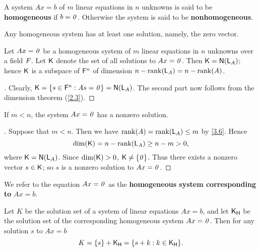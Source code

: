 \begin{defn}\label{3.3.2}
  A system \(Ax = b\) of \(m\) linear equations in \(n\) unknowns is said to be \textbf{homogeneous} if \(b = \mathit{0}\).
  Otherwise the system is said to be \textbf{nonhomogeneous}.
\end{defn}

\begin{note}
  Any homogeneous system has at least one solution, namely, the zero vector.
\end{note}

\begin{thm}\label{3.8}
  Let \(Ax = \mathit{0}\) be a homogeneous system of \(m\) linear equations in \(n\) unknowns over a field \(\mathit{F}\).
  Let \(\mathsf{K}\) denote the set of all solutions to \(Ax = \mathit{0}\).
  Then \(\vs{K} = \ns{\L_A}\);
  hence \(\mathsf{K}\) is a subspace of \(\mathsf{F}^n\) of dimension \(n - \rk{\L_A} = n - \rk{A}\).
\end{thm}

\begin{proof}[]
  Clearly, \(\vs{K} = \set{s \in \vs{F}^n : As = \zv} = \ns{\L_A}\).
  The second part now follows from the dimension theorem (\cref{2.3}).
\end{proof}

\begin{cor}\label{3.3.3}
  If \(m < n\), the system \(Ax = \mathit{0}\) has a nonzero solution.
\end{cor}

\begin{proof}[]
  Suppose that \(m < n\).
  Then we have \(\rk{A} = \rk{\L_A} \leq m\) by \cref{3.6}.
  Hence
  \[
    \dim(\vs{K}) = n - \rk{\L_A} \geq n - m > 0,
  \]
  where \(\vs{K} = \ns{\L_A}\).
  Since \(\dim(\mathsf{K}) > 0\), \(\mathsf{K} \neq \left\lbrace\mathit{0}\right\rbrace\).
  Thus there exists a nonzero vector \(s \in \mathsf{K}\);
  so \(s\) is a nonzero solution to \(Ax = \mathit{0}\).
\end{proof}

\begin{defn}\label{3.3.4}
  We refer to the equation \(Ax = \mathit{0}\) as the \textbf{homogeneous system corresponding to} \(Ax = b\).
\end{defn}

\begin{thm}\label{3.9}
  Let \(K\) be the solution set of a system of linear equations \(Ax = b\), and let \(\mathsf{K}_{\mathsf{H}}\) be the solution set of the corresponding homogeneous system \(Ax = \mathit{0}\).
  Then for any solution \(s\) to \(Ax = b\)
  \[
    K = \set{s} + \vs{K}_{\vs{H}} = \set{s + k : k \in \vs{K}_{\vs{H}}}.
  \]
\end{thm}

